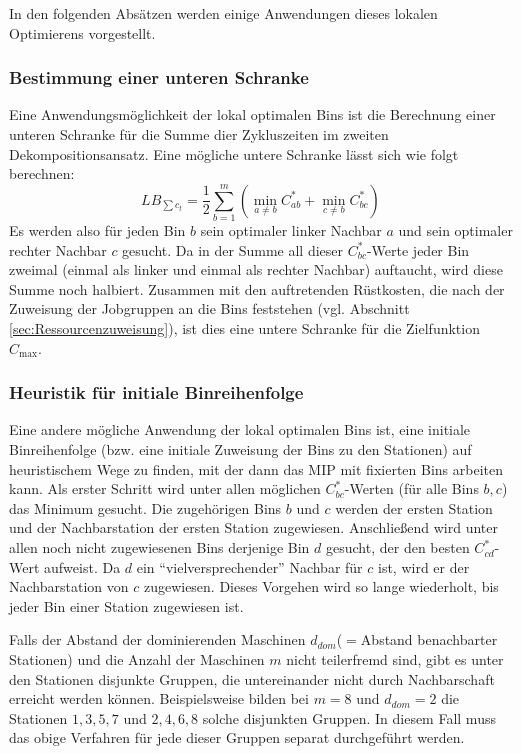 \documentclass{scrreprt}
\begin{document}
In den folgenden Absätzen werden einige Anwendungen dieses lokalen Optimierens vorgestellt.

\subsubsection{Bestimmung einer unteren Schranke}
Eine Anwendungsmöglichkeit der lokal optimalen Bins ist die Berechnung einer unteren Schranke für die Summe dier Zykluszeiten im zweiten Dekompositionsansatz.
Eine mögliche untere Schranke lässt sich wie folgt berechnen:
\[LB_{\sum c_t} = \frac{1}{2} \sum_{b=1}^m \left( \min_{a\neq b} C_{ab}^* + \min_{c\neq b} C_{bc}^* \right) \]
Es werden also für jeden Bin $b$ sein optimaler linker Nachbar $a$ und sein optimaler rechter Nachbar $c$ gesucht.
Da in der Summe all dieser $C_{bc}^*$-Werte jeder Bin zweimal (einmal als linker und einmal als rechter Nachbar) auftaucht,
wird diese Summe noch halbiert.
Zusammen mit den auftretenden Rüstkosten, die nach der Zuweisung der Jobgruppen an die Bins feststehen (vgl. Abschnitt \ref{sec:Ressourcenzuweisung}),
ist dies eine untere Schranke für die Zielfunktion $C_{\max}$.

\subsubsection{Heuristik für initiale Binreihenfolge}
Eine andere mögliche Anwendung der lokal optimalen Bins ist, eine initiale Binreihenfolge (bzw. eine initiale Zuweisung der Bins zu den Stationen)
auf heuristischem Wege zu finden, mit der dann das MIP mit fixierten Bins arbeiten kann.
Als erster Schritt wird unter allen möglichen $C_{bc}^*$-Werten (für alle Bins $b,c$) das Minimum gesucht.
Die zugehörigen Bins $b$ und $c$ werden der ersten Station und der Nachbarstation der ersten Station zugewiesen.
Anschließend wird unter allen noch nicht zugewiesenen Bins derjenige Bin $d$ gesucht, der den besten $C_{cd}^*$-Wert aufweist.
Da $d$ ein "`vielversprechender"' Nachbar für $c$ ist, wird er der Nachbarstation von $c$ zugewiesen.
Dieses Vorgehen wird so lange wiederholt, bis jeder Bin einer Station zugewiesen ist.

Falls der Abstand der dominierenden Maschinen $d_{\mathit{dom}}$($=$Abstand benachbarter Stationen) und die Anzahl der Maschinen $m$ nicht teilerfremd sind,
gibt es unter den Stationen disjunkte Gruppen, die untereinander nicht durch Nachbarschaft erreicht werden können.
Beispielsweise bilden bei $m=8$ und $d_{\mathit{dom}}=2$ die Stationen $1,3,5,7$ und $2,4,6,8$ solche disjunkten Gruppen.
In diesem Fall muss das obige Verfahren für jede dieser Gruppen separat durchgeführt werden.
\end{document}
